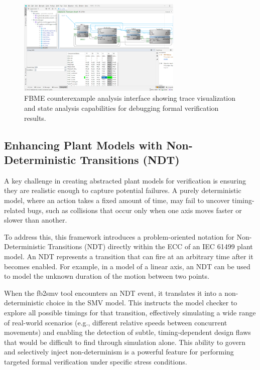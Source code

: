 \begin{figure}[h]
\centering
\includegraphics[width=0.7\textwidth]{chapters/images/chapter2/FBME_cex.png}
\caption{FBME counterexample analysis interface showing trace visualization and state analysis capabilities for debugging formal verification results.}
\label{fig:fbme_cex}
\end{figure}

\subsection{Enhancing Plant Models with Non-Deterministic Transitions (NDT)}

A key challenge in creating abstracted plant models for verification is ensuring they are realistic enough to capture potential failures. A purely deterministic model, where an action takes a fixed amount of time, may fail to uncover timing-related bugs, such as collisions that occur only when one axis moves faster or slower than another.

To address this, this framework introduces a problem-oriented notation for Non-Deterministic Transitions (NDT) directly within the ECC of an IEC 61499 plant model. An NDT represents a transition that can fire at an arbitrary time after it becomes enabled. For example, in a model of a linear axis, an NDT can be used to model the unknown duration of the motion between two points.

When the fb2smv tool encounters an NDT event, it translates it into a non-deterministic choice in the SMV model. This instructs the model checker to explore all possible timings for that transition, effectively simulating a wide range of real-world scenarios (e.g., different relative speeds between concurrent movements) and enabling the detection of subtle, timing-dependent design flaws that would be difficult to find through simulation alone. This ability to govern and selectively inject non-determinism is a powerful feature for performing targeted formal verification under specific stress conditions.

